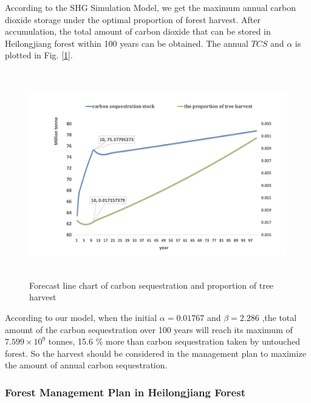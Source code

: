According to the SHG Simulation Model, we get the maximum annual carbon dioxide storage under the optimal proportion of forest harvest. After accumulation, the total amount of carbon dioxide that can be stored in Heilongjiang forest within 100 years can be obtained. The annual $TCS$ and $\alpha$ is plotted in Fig. [\ref{Forecast line chart}].
\begin{figure}[H]
\centering
\includegraphics[height = 9cm, width = 14cm]{mcmthesis-demo/figures/Stock.png}
\caption{Forecast line chart of carbon sequestration and proportion of tree harvest}
\label{Forecast line chart}
\end{figure}
According to our model, when the initial $\alpha =0.01767 $ and $\beta = 2.286 $ ,the total amount of the carbon sequestration over 100 years will reach its maximum of $7.599\times 10^9$ tonnes, 15.6 \% more than carbon sequestration taken by untouched forest. So the harvest should be considered in the management plan to maximize the amount of annual carbon sequestration.

\subsubsection{Forest Management Plan in Heilongjiang Forest}

